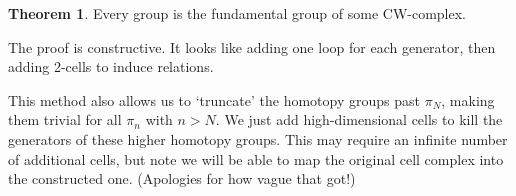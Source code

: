 \documentclass[a4paper,12pt]{article}
\theoremstyle{definition}
\newtheorem*{thm}{Theorem}
\begin{document}
\begin{thm}
Every group is the fundamental group of some CW-complex.
\end{thm}

The proof is constructive. It looks like adding one loop for each generator, then adding 2-cells to induce relations.

This method also allows us to `truncate' the homotopy groups past $\pi_N$, making them trivial for all $\pi_n$ with $n > N$.
We just add high-dimensional cells to kill the generators of these higher homotopy groups.
This may require an infinite number of additional cells, but note we will be able to map the original cell complex into the constructed one.
(Apologies for how vague that got!)
\end{document}
